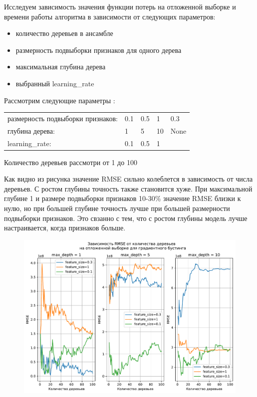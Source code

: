 \documentclass[a4paper, 12pt]{report}
\begin{document}
Исследуем зависимость значения функции потерь на отложенной выборке и  времени работы алгоритма в зависимости от следующих параметров:
\begin{itemize}
        \item количество деревьев в ансамбле 
        \item размерность подвыборки признаков для одного дерева
        \item максимальная глубина дерева
        \item выбранный learning\_rate
\end{itemize}


Рассмотрим следующие параметры :
\begin{table}[H]
\begin{tabular}{lllll}
размерность подвыборки признаков: & 0.1 & 0.5 & 1 & 0.3  \\
глубина дерева:  & 1 & 5 & 10 & None  \\
learning\_rate: & 0.1 & 0.5 & 1   \\
\end{tabular}
\end{table}

Количество деревьев рассмотри от 1 до 100


Как видно из рисунка значение RMSE сильно колеблется в зависимость от числа деревьев. С ростом глубины точность также становится хуже. При максимальной глубине 1 и размере подвыборки признаков 10-30\% значение RMSE близки к нулю, но при большей глубине точность лучше при большей размерности подвыборки признаков. Это свзанно с тем, что с ростом глубины модель лучше настраивается, когда признаков больше.
\begin{figure}[H]
        	\centering
        	\includegraphics[width=1\linewidth]{ex2_1.pdf}
        	\label{fig:mpr}
        	\vspace{-23pt}
\end{figure}
\end{document}
